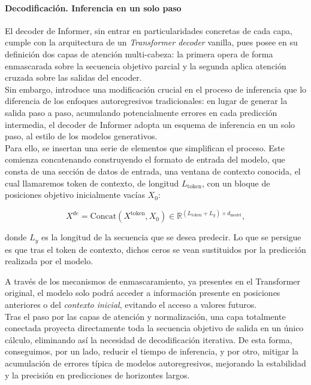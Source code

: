 \paragraph{Decodificación. Inferencia en un solo paso}

El decoder de Informer, sin entrar en particularidades concretas de cada capa, cumple con la arquitectura de un \textit{Transformer decoder} vanilla, pues posee en su definición dos capas de atención multi-cabeza: la primera opera de forma enmascarada sobre la secuencia objetivo parcial y la segunda aplica atención cruzada sobre las salidas del encoder.\\

Sin embargo, introduce una modificación crucial en el proceso de inferencia que lo diferencia de los enfoques autoregresivos tradicionales: en lugar de generar la salida paso a paso, acumulando potencialmente errores en cada predicción intermedia, el decoder de Informer adopta un esquema de inferencia en un solo paso, al estilo de los modelos generativos.\\

Para ello, se insertan una serie de elementos que simplifican el proceso. Este comienza concatenando construyendo el formato de entrada del modelo, que consta de una sección de datos de entrada, una ventana de contexto conocida, el cual llamaremos token de contexto, de longitud $L_{\text{token}}$, con un bloque de posiciones objetivo inicialmente vacías $X_0$:

\[
X^{de} = \text{Concat}(X^{\text{token}}, X_0) \in \mathbb{R}^{(L_{\text{token}} + L_y) \times d_{\text{model}}},
\]

donde $L_y$ es la longitud de la secuencia que se desea predecir.  Lo que se persigue es que tras el token de contexto, dichos ceros se vean sustituidos por la predicción realizada por  el modelo.

A través de los mecanismos de enmascaramiento, ya presentes en el Transformer original, el modelo solo podrá acceder a información presente en posiciones anteriores o del \textit{contexto inicial}, evitando el acceso a valores futuros.\\

Tras el paso por las capas de atención y normalización, una capa totalmente conectada proyecta directamente toda la secuencia objetivo de salida en un único cálculo, eliminando así la necesidad de decodificación iterativa. De esta forma, conseguimos, por un lado, reducir el tiempo de inferencia, y por otro, mitigar la acumulación de errores típica de modelos autoregresivos, mejorando la estabilidad y la precisión en predicciones de horizontes largos.


